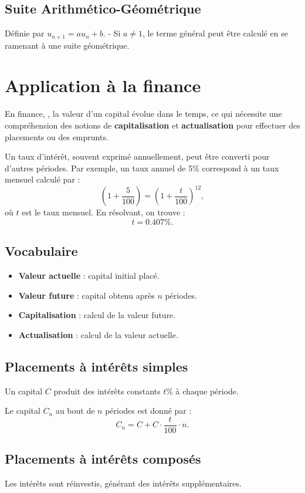 \documentclass[a4paper,10pt]{article}
\begin{document}
\subsection*{Suite Arithmético-Géométrique}
Définie par \( u_{n+1} = au_n + b \).
- Si \( a \neq 1 \), le terme général peut être calculé en se ramenant à une suite géométrique.


\section*{Application à la finance}


En finance, , la valeur d'un capital évolue dans le temps, ce qui nécessite une compréhension des notions de \textbf{capitalisation} et \textbf{actualisation} pour effectuer des placements ou des emprunts.

Un taux d'intérêt, souvent exprimé annuellement, peut être converti pour d'autres périodes. Par exemple, un taux annuel de 5\% correspond à un taux mensuel calculé par :
\[
\left( 1 + \frac{5}{100} \right) = \left( 1 + \frac{t}{100} \right)^{12},
\]
où \(t\) est le taux mensuel. En résolvant, on trouve :
\[
t = 0.407\%.
\]

\subsection*{Vocabulaire}
\begin{itemize}
    \item \textbf{Valeur actuelle} : capital initial placé.
    \item \textbf{Valeur future} : capital obtenu après \(n\) périodes.
    \item \textbf{Capitalisation} : calcul de la valeur future.
    \item \textbf{Actualisation} : calcul de la valeur actuelle.
\end{itemize}

\subsection*{Placements à intérêts simples}
Un capital \(C\) produit des intérêts constants \(t\%\) à chaque période. 

Le capital \(C_n\) au bout de \(n\) périodes est donné par :
\[
C_n = C + C \cdot \frac{t}{100} \cdot n.
\]

\subsection*{Placements à intérêts composés}
Les intérêts sont réinvestis, générant des intérêts supplémentaires.
\end{document}
